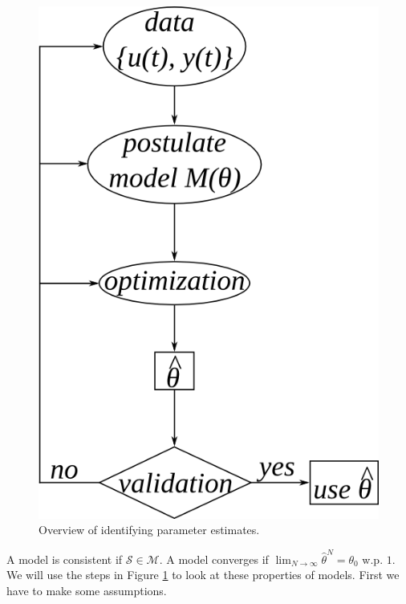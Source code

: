 \begin{figure}[ht!]
	\centering
	\includegraphics[width=.5\textwidth]{images/13overview}
	\caption{Overview of identifying parameter estimates.}
	\label{fig:13overview}
\end{figure}

A model is consistent if $\mathcal{S}\in\mathcal{M}$. A model converges if $\lim_{N\to\infty}\hat{\theta}^N = \theta_0$ w.p. $1$. We will use the steps in Figure \ref{fig:13overview} to look at these properties of models. First we have to make some assumptions.

